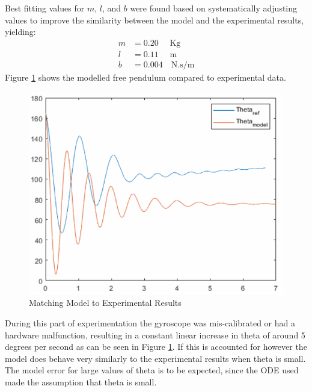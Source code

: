 \documentclass[11pt, a4paper,twocolumn]{article}
\begin{document}
Best fitting values for $m$, $l$, and $b$ were found based on systematically adjusting values to improve the similarity between the model and the experimental results, yielding:
\begin{align*}
	m &= 0.20\quad \text{ Kg}\\
	l &= 0.11\quad \text{ m}\\
	b &= 0.004\quad \text{N.s/m}
\end{align*}
Figure \ref{fig:damping_match} shows the modelled free pendulum compared to experimental data. 

\begin{figure}[hb!]
\centering
\includegraphics[scale=0.35]{24}
\caption{Matching Model to Experimental Results}
\label{fig:damping_match}
\end{figure}

During this part of experimentation the gyroscope was mis-calibrated or had a hardware malfunction, resulting in a constant linear increase in theta of around 5 degrees per second as can be seen in Figure \ref{fig:damping_match}. If this is accounted for however the model does behave very similarly to the experimental results when theta is small. The model error for large values of theta is to be expected, since the ODE used made the assumption that theta is small.
\end{document}
